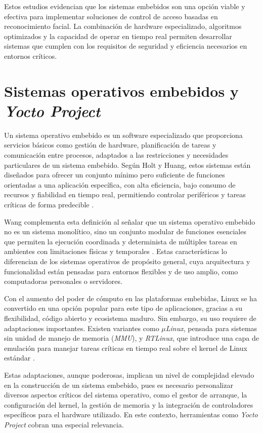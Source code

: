 Estos estudios evidencian que los sistemas embebidos son una opción viable y efectiva para implementar soluciones de control de acceso basadas en reconocimiento facial. La combinación de hardware especializado, algoritmos optimizados y la capacidad de operar en tiempo real permiten desarrollar sistemas que cumplen con los requisitos de seguridad y eficiencia necesarios en entornos críticos.

\section{Sistemas operativos embebidos y \textit{Yocto Project}}


Un sistema operativo embebido es un software especializado que proporciona servicios básicos como gestión de hardware, planificación de tareas y comunicación entre procesos, adaptados a las restricciones y necesidades particulares de un sistema embebido. Según Holt y Huang, estos sistemas están diseñados para ofrecer un conjunto mínimo pero suficiente de funciones orientadas a una aplicación específica, con alta eficiencia, bajo consumo de recursos y fiabilidad en tiempo real, permitiendo controlar periféricos y tareas críticas de forma predecible \cite{holt_2018_embedded_os}.

Wang complementa esta definición al señalar que un sistema operativo embebido no es un sistema monolítico, sino un conjunto modular de funciones esenciales que permiten la ejecución coordinada y determinista de múltiples tareas en ambientes con limitaciones físicas y temporales \cite{wang_2023_embedded_RTOS}. Estas características lo diferencian de los sistemas operativos de propósito general, cuya arquitectura y funcionalidad están pensadas para entornos flexibles y de uso amplio, como computadoras personales o servidores.

Con el aumento del poder de cómputo en las plataformas embebidas, Linux se ha convertido en una opción popular para este tipo de aplicaciones, gracias a su flexibilidad, código abierto y ecosistema maduro. Sin embargo, su uso requiere de adaptaciones importantes. Existen variantes como \textit{$\mu$Linux}, pensada para sistemas sin unidad de manejo de memoria (\textit{MMU}), y \textit{RTLinux}, que introduce una capa de emulación para manejar tareas críticas en tiempo real sobre el kernel de Linux estándar \cite{holt_2018_embedded_os} \cite{wang_2023_embedded_RTOS}.

Estas adaptaciones, aunque poderosas, implican un nivel de complejidad elevado en la construcción de un sistema embebido, pues es necesario personalizar diversos aspectos críticos del sistema operativo, como el gestor de arranque, la configuración del kernel, la gestión de memoria y la integración de controladores específicos para el hardware utilizado. En este contexto, herramientas como \textit{Yocto Project} cobran una especial relevancia. 

